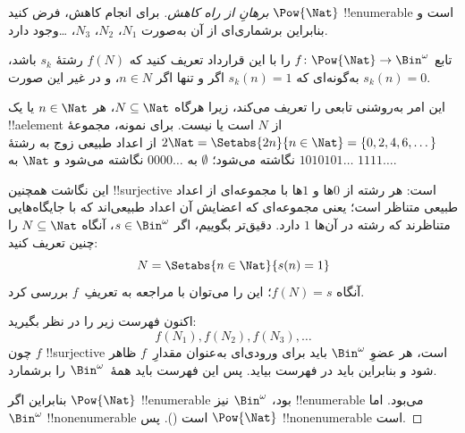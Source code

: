 \documentclass[../../../include/open-logic-section]{subfiles}
\begin{document}
\begin{proof}[برهانِ {} از راه کاهش]
برای انجام کاهش، فرض کنید $\Pow{\Nat}$ !!{enumerable} است و بنابراین
برشماری‌ای از آن به‌صورت $N_{1}$، $N_{2}$، $N_{3}$، \dots وجود دارد.

تابع $f \colon \Pow{\Nat} \to \Bin^\omega$ را با این قرارداد تعریف
کنید که $f(N)$ رشتهٔ $s_{k}$ باشد، به‌گونه‌ای که $s_{k}(n) = 1$ اگر و تنها
اگر $n \in N$، و در غیر این صورت $s_k(n) = 0$.

این امر به‌روشنی تابعی را تعریف می‌کند، زیرا هرگاه $N \subseteq \Nat$،
هر $n \in \Nat$ یا یک !!a{element} از $N$ است یا نیست. برای نمونه،
مجموعهٔ $2\Nat = \Setabs{2n}{n \in \Nat} = \{0,2, 4, 6,
\dots\}$ از اعداد طبیعی زوج به رشتهٔ $1010101\dots$ نگاشته می‌شود؛
$\emptyset$ به $0000\dots$ نگاشته می‌شود و $\Nat$ به
$1111\dots$.

این نگاشت همچنین !!{surjective} است: هر رشته از $0$ها و $1$ها با
مجموعه‌ای از اعداد طبیعی متناظر است؛ یعنی مجموعه‌ای که اعضایش آن اعداد
طبیعی‌اند که با جایگاه‌هایی متناظرند که رشته در آن‌ها $1$ دارد. دقیق‌تر
بگوییم، اگر $s \in \Bin^\omega$، آنگاه $N
\subseteq \Nat$ را چنین تعریف کنید:
\[
N = \Setabs{n \in \Nat}{s(n) = 1}
\]
آنگاه $f(N) = s$؛ این را می‌توان با مراجعه به تعریفِ~$f$ بررسی کرد.

اکنون فهرست زیر را در نظر بگیرید:
\[
f(N_1), f(N_2), f(N_3), \dots
\]
چون $f$ !!{surjective} است، هر عضوِ $\Bin^\omega$ باید برای ورودی‌ای
به‌عنوان مقدارِ~$f$ ظاهر شود و بنابراین باید در فهرست بیاید. پس این
فهرست باید همهٔ~$\Bin^\omega$ را برشمارد.

بنابراین اگر $\Pow{\Nat}$ !!{enumerable} بود، $\Bin^\omega$ نیز
!!{enumerable} می‌بود. اما $\Bin^\omega$ !!{nonenumerable} است
(). پس $\Pow{\Nat}$
!!{nonenumerable} است.
\end{proof}

\end{document}
